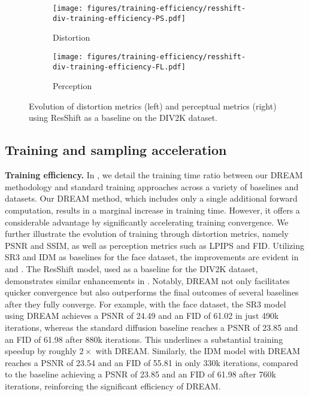 \begin{figure}[h]
     \centering
     \begin{subfigure}[b]{0.23\textwidth}
         \centering
         \texttt{[image: figures/training-efficiency/resshift-div-training-efficiency-PS.pdf]}
         \caption{Distortion}
         \label{fig:res-div-training-ps}
     \end{subfigure}
     \begin{subfigure}[b]{0.242\textwidth}
         \centering
         \texttt{[image: figures/training-efficiency/resshift-div-training-efficiency-FL.pdf]}
         \caption{Perception}
         \label{fig:res-div-training-fl}
     \end{subfigure}
     \vspace{-.28in}
         \caption{Evolution of distortion metrics (left) and perceptual metrics (right) using ResShift as a baseline on the DIV2K dataset.}
        \label{fig:res-div-training}
        \vspace{-.1in}
\end{figure}

\subsection{Training and sampling acceleration}\label{sec:app-efficiency}

\textbf{Training efficiency.} In , we detail the training time ratio between our DREAM methodology and standard training approaches across a variety of baselines and datasets. Our DREAM method, which includes only a single additional forward computation, results in a marginal increase in training time. However, it offers a considerable advantage by significantly accelerating training convergence. We further illustrate the evolution of training through distortion metrics, namely PSNR and SSIM, as well as perception metrics such as LPIPS and FID. Utilizing SR3 and IDM as baselines for the face dataset, the improvements are evident in  and . The ResShift model, used as a baseline for the DIV2K dataset, demonstrates similar enhancements in . Notably, DREAM not only facilitates quicker convergence but also outperforms the final outcomes of several baselines after they fully converge. For example, with the face dataset, the SR3 model using DREAM achieves a PSNR of 24.49 and an FID of 61.02 in just 490k iterations, whereas the standard diffusion baseline reaches a PSNR of 23.85 and an FID of 61.98 after 880k iterations. This underlines a substantial training speedup by roughly $2 \times$ with DREAM. Similarly, the IDM model with DREAM reaches a PSNR of 23.54 and an FID of 55.81 in only 330k iterations, compared to the baseline achieving a PSNR of 23.85 and an FID of 61.98 after 760k iterations, reinforcing the significant efficiency of DREAM.

